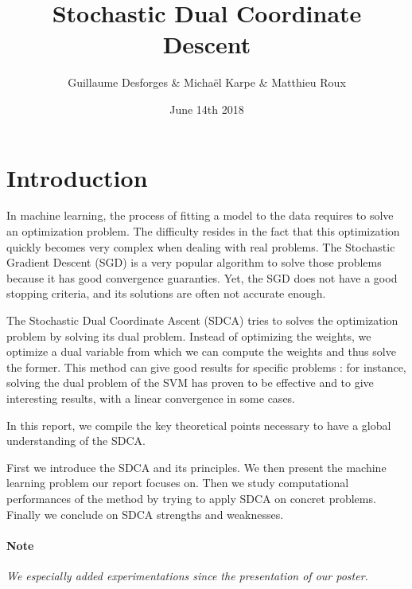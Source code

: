 \documentclass{article}
\title{Stochastic Dual Coordinate Descent}
\author{Guillaume Desforges \& Michaël Karpe \& Matthieu Roux}
\date{June 14th 2018}
\begin{document}
\maketitle


\section*{Introduction}

In machine learning, the process of fitting a model to the data requires to solve an optimization problem.
The difficulty resides in the fact that this optimization quickly becomes very complex when dealing with real problems.
The Stochastic Gradient Descent (SGD) is a very popular algorithm to solve those problems because it has good convergence guaranties.
Yet, the SGD does not have a good stopping criteria, and its solutions are often not accurate enough.

The Stochastic Dual Coordinate Ascent (SDCA) tries to solves the optimization problem by solving its dual problem.
Instead of optimizing the weights, we optimize a dual variable from which we can compute the weights and thus solve the former.
This method can give good results for specific problems : for instance, solving the dual problem of the SVM has proven to be effective and to give interesting results, with a linear convergence in some cases.

In this report, we compile the key theoretical points necessary to have a global understanding of the SDCA.

First we introduce the SDCA and its principles.
We then present the machine learning problem our report focuses on.
Then we study computational performances of the method by trying to apply SDCA on concret problems.
Finally we conclude on SDCA strengths and weaknesses.

\paragraph{Note} \textit{We especially added experimentations since the presentation of our poster.}
\end{document}
